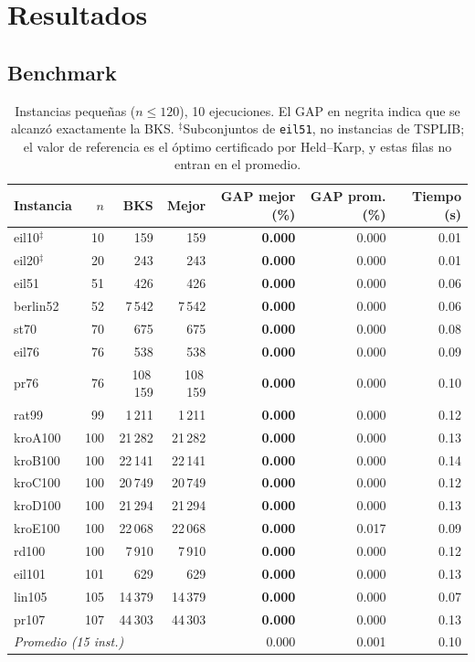 \documentclass[runningheads]{llncs}
\begin{document}
\section{Resultados}
\label{sec:results}

\subsection{Benchmark}

\begin{table}
\caption{Instancias pequeñas ($n\le 120$), 10 ejecuciones. El GAP en
negrita indica que se alcanzó exactamente la BKS.
$^{\ddagger}$Subconjuntos de \texttt{eil51}, no instancias de TSPLIB; el
valor de referencia es el óptimo certificado por Held--Karp, y estas
filas no entran en el promedio.}
\label{tab:small}
\centering\scriptsize
\begin{tabular}{@{}lrrrrrr@{}}
\toprule
\textbf{Instancia} & $n$ & \textbf{BKS} & \textbf{Mejor} & \textbf{GAP mejor (\%)} & \textbf{GAP prom. (\%)} & \textbf{Tiempo (s)}\\
\midrule
eil10$^{\ddagger}$ & 10 & 159 & 159 & \textbf{0.000} & 0.000 & 0.01 \\
eil20$^{\ddagger}$ & 20 & 243 & 243 & \textbf{0.000} & 0.000 & 0.01 \\
eil51 & 51 & 426 & 426 & \textbf{0.000} & 0.000 & 0.06 \\
berlin52 & 52 & 7\,542 & 7\,542 & \textbf{0.000} & 0.000 & 0.06 \\
st70 & 70 & 675 & 675 & \textbf{0.000} & 0.000 & 0.08 \\
eil76 & 76 & 538 & 538 & \textbf{0.000} & 0.000 & 0.09 \\
pr76 & 76 & 108\,159 & 108\,159 & \textbf{0.000} & 0.000 & 0.10 \\
rat99 & 99 & 1\,211 & 1\,211 & \textbf{0.000} & 0.000 & 0.12 \\
kroA100 & 100 & 21\,282 & 21\,282 & \textbf{0.000} & 0.000 & 0.13 \\
kroB100 & 100 & 22\,141 & 22\,141 & \textbf{0.000} & 0.000 & 0.14 \\
kroC100 & 100 & 20\,749 & 20\,749 & \textbf{0.000} & 0.000 & 0.12 \\
kroD100 & 100 & 21\,294 & 21\,294 & \textbf{0.000} & 0.000 & 0.13 \\
kroE100 & 100 & 22\,068 & 22\,068 & \textbf{0.000} & 0.017 & 0.09 \\
rd100 & 100 & 7\,910 & 7\,910 & \textbf{0.000} & 0.000 & 0.12 \\
eil101 & 101 & 629 & 629 & \textbf{0.000} & 0.000 & 0.13 \\
lin105 & 105 & 14\,379 & 14\,379 & \textbf{0.000} & 0.000 & 0.07 \\
pr107 & 107 & 44\,303 & 44\,303 & \textbf{0.000} & 0.000 & 0.13 \\
\midrule
\multicolumn{4}{l}{\textit{Promedio (15 inst.)}} & 0.000 & 0.001 & 0.10 \\
\bottomrule
\end{tabular}
\end{table}
\end{document}

